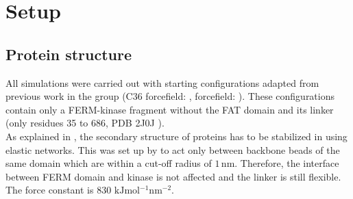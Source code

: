 \chapter{Setup}
\section{Protein structure}
All simulations were carried out with starting configurations adapted from previous work in the group (C36 forcefield: \textcite{pap003}, \martini{} forcefield: \textcite{sara}). These configurations contain only a FERM-kinase fragment without the FAT domain and its linker (only residues 35 to 686, PDB 2J0J \autocite{structFAK}).\\
As explained in , the secondary structure of proteins has to be stabilized in \martini{} using elastic networks. This was set up by \textcite{sara} to act only between backbone beads of the same domain which are within a cut-off radius of $1\,\si{\nano\metre}$. Therefore, the interface between FERM domain and kinase is not affected and the linker is still flexible. The force constant is 830 $\si{\kilo\joule\mole^{-1}\nano\meter^{-2}}$.
